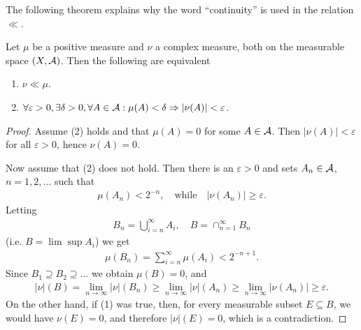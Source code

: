 The following theorem explains why the word ``continuity'' is used in the relation $\ll$.

\begin{theorem}\label{thm: why it is called absolutely continuous}
Let $\mu$ be a positive measure and $\nu$ a complex measure, both on the measurable space $(X, \mathcal{A})$. Then the following are equivalent
\begin{enumerate}
\item $\nu \ll \mu$.
\item $\forall \varepsilon>0, \exists \delta > 0, \forall A\in \mathcal{A} : \mu(A)<\delta \Rightarrow |\nu(A)|<\varepsilon$.
\end{enumerate}
\end{theorem}
\begin{proof}
Assume (2) holds and that $\mu(A)=0$ for some $A\in \mathcal{A}$. Then $|\nu(A)|<\varepsilon$ for all $\varepsilon > 0$, hence $\nu(A) = 0$.

Now assume that (2) does not hold. Then there is an $\varepsilon > 0$ and sets $A_{n}\in \mathcal{A}$, $n=1, 2, \dots$ such that
\begin{align*}
	\mu(A_{n})<2^{-n}, \quad \text{while} \quad |\nu(A_{n})| \ge \varepsilon.
\end{align*}
Letting
\begin{align*}
	B_{n}=\bigcup_{i=n}^{\infty}A_{i}, \quad B=\cap_{n=1}^{\infty}B_{n}
\end{align*}
(i.e. $B=\lim\sup A_{i}$) we get
\begin{align*}
	\mu(B_{n})=\sum_{i=n}^{\infty}\mu(A_{i}) < 2^{-n+1}.
\end{align*}
Since $B_{1} \supseteq B_{2} \supseteq \dots$ we obtain $\mu(B)=0$, and
\begin{align*}
	|\nu|(B)=\lim_{n\to \infty} |\nu|(B_{n})\ge \lim_{n\to \infty} |\nu|(A_{n}) \ge \lim_{n\to \infty} |\nu(A_{n})| \ge \varepsilon.
\end{align*}
On the other hand, if (1) was true, then, for every measurable subset $E\subseteq B$, we would have $\nu(E)=0$, and therefore $|\nu|(E)=0$, which is a contradiction.
\end{proof}


